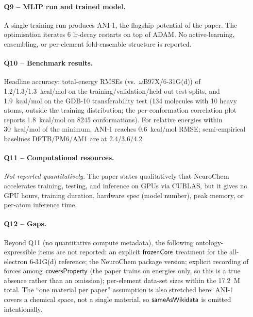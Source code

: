 \paragraph{Q9 -- MLIP run and trained model.}
A single training run produces ANI-1, the flagship potential of
the paper. The optimisation iterates 6 lr-decay restarts on top
of ADAM. No active-learning, ensembling, or per-element
fold-ensemble structure is reported.


\paragraph{Q10 -- Benchmark results.}
Headline accuracy: total-energy RMSEs (vs.\ $\omega$B97X/6-31G(d))
of 1.2/1.3/1.3~kcal/mol on the training/validation/held-out
test splits, and 1.9~kcal/mol on the GDB-10 transferability
test (134 molecules with 10 heavy atoms, outside the training
distribution; the per-conformation correlation plot reports
1.8~kcal/mol on 8245 conformations). For relative energies
within 30~kcal/mol of the minimum, ANI-1 reaches 0.6~kcal/mol
RMSE; semi-empirical baselines DFTB/PM6/AM1 are at 2.4/3.6/4.2.


\paragraph{Q11 -- Computational resources.}
\emph{Not reported quantitatively.} The paper states
qualitatively that NeuroChem accelerates training, testing, and
inference on GPUs via CUBLAS, but it gives no GPU hours,
training duration, hardware spec (model number), peak memory,
or per-atom inference time.


\paragraph{Q12 -- Gaps.}
Beyond Q11 (no quantitative compute metadata), the following
ontology-expressible items are not reported: an explicit
$\mathsf{frozenCore}$ treatment for the all-electron
6-31G(d) reference; the NeuroChem package version; explicit
recording of forces among $\mathsf{coversProperty}$ (the paper
trains on energies only, so this is a true absence rather than
an omission); per-element data-set sizes within the 17.2~M
total. The ``one material per paper'' assumption is also
stretched here: ANI-1 covers a chemical space, not a single
material, so $\mathsf{sameAsWikidata}$ is omitted intentionally.
